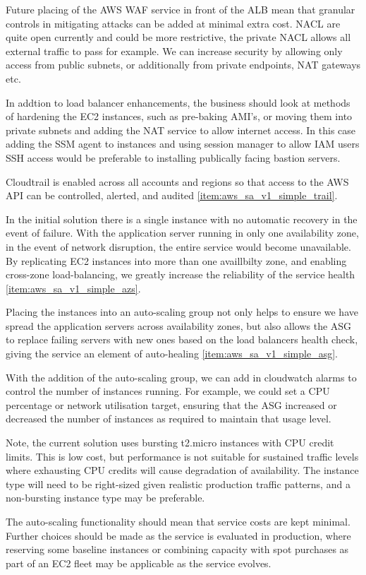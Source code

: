 Future placing of the AWS WAF service in front of the ALB mean that granular controls in mitigating attacks can be added at minimal extra cost. NACL are quite open currently and could be more restrictive, the private NACL allows all external traffic to pass for example. We can increase security by allowing only access from public subnets, or additionally from private endpoints, NAT gateways etc. 

In addtion to load balancer enhancements, the business should look at methods of hardening the EC2 instances, such as pre-baking AMI's, or moving them into private subnets and adding the NAT service to allow internet access. In this case adding the SSM agent to instances and using session manager to allow IAM users SSH access would be preferable to installing publically facing bastion servers.

Cloudtrail is enabled across all accounts and regions so that access to the AWS API can be controlled, alerted, and audited \ref{item:aws_sa_v1_simple_trail}.


In the initial solution there is a single instance with no automatic recovery in the event of failure. With the application server running in only one availability zone, in the event of network disruption, the entire service would become unavailable. By replicating EC2 instances into more than one availlbilty zone, and enabling cross-zone load-balancing, we greatly increase the reliability of the service health \ref{item:aws_sa_v1_simple_azs}.

Placing the instances into an auto-scaling group not only helps to ensure we have spread the application servers across availability zones, but also allows the ASG to replace failing servers with new ones based on the load balancers health check, giving the service an element of auto-healing \ref{item:aws_sa_v1_simple_asg}.


With the addition of the auto-scaling group, we can add in cloudwatch alarms to control the number of instances running. For example, we could set a CPU percentage or network utilisation target, ensuring that the ASG increased or decreased the number of instances as required to maintain that usage level.

Note, the current solution uses bursting t2.micro instances with CPU credit limits. This is low cost, but performance is not suitable for sustained traffic levels where exhausting CPU credits will cause degradation of availability. The instance type will need to be right-sized given realistic production traffic patterns, and a non-bursting instance type may be preferable.


The auto-scaling functionality should mean that service costs are kept minimal. Further choices should be made as the service is evaluated in production, where reserving some baseline instances or combining capacity with spot purchases as part of an EC2 fleet may be applicable as the service evolves.

\newpage




